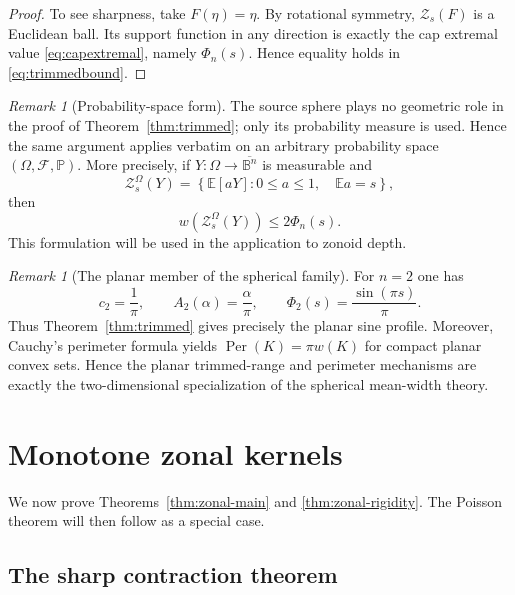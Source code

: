 \documentclass[11pt,reqno]{amsart}
\theoremstyle{remark}
\newtheorem{remark}[theorem]{Remark}
\begin{document}
\begin{proof}
To see sharpness, take $F(\eta)=\eta$.  By rotational symmetry,
$\mathcal Z_s(F)$ is a Euclidean ball.  Its support function in any direction
is exactly the cap extremal value \eqref{eq:capextremal}, namely
$\Phi_n(s)$.  Hence equality holds in \eqref{eq:trimmedbound}.
\end{proof}

\begin{remark}[Probability-space form]\label{rem:probability-trimmed}
The source sphere plays no geometric role in the proof of
Theorem~\ref{thm:trimmed}; only its probability measure is used.  Hence the
same argument applies verbatim on an arbitrary probability space
$(\Omega,\mathcal F,\mathbb P)$.  More precisely, if
$Y:\Omega\to\overline{\mathbb B^n}$ is measurable and
\[
 \mathcal Z_s^\Omega(Y)
 =
 \left\{
 \mathbb E[aY]:
 0\le a\le1,\quad \mathbb E a=s
 \right\},
\]
then
\[
 w(\mathcal Z_s^\Omega(Y))\le2\Phi_n(s).
\]
This formulation will be used in the application to zonoid depth.
\end{remark}

\begin{remark}[The planar member of the spherical family]\label{rem:planar}
For $n=2$ one has
\[
 c_2=\frac1\pi,\qquad
 A_2(\alpha)=\frac{\alpha}{\pi},\qquad
 \Phi_2(s)=\frac{\sin(\pi s)}{\pi}.
\]
Thus Theorem~\ref{thm:trimmed} gives precisely the planar sine profile.
Moreover, Cauchy's perimeter formula yields
$\operatorname{Per}(K)=\pi w(K)$ for compact planar convex sets.  Hence
the planar trimmed-range and perimeter mechanisms are exactly the
two-dimensional specialization of the spherical mean-width theory.
\end{remark}

\section{Monotone zonal kernels}

We now prove Theorems~\ref{thm:zonal-main} and
\ref{thm:zonal-rigidity}.  The Poisson theorem will then follow as a
special case.

\subsection{The sharp contraction theorem}
\end{document}
